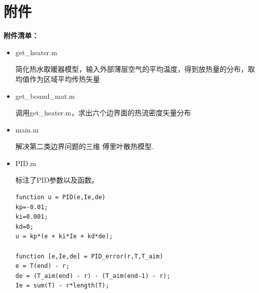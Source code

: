 \documentclass{my_paper}
\begin{document}
\newpage
\begin{center}
\end{center}

\newpage
\section{附件}
\textbf{附件清单：}
\renewcommand\theenumi{\roman{enumi}}
\renewcommand\labelenumi{\textbf{附录\theenumi}}
\begin{itemize}
    \item get\_heater.m 
    
    简化热水取暖器模型，输入外部薄层空气的平均温度，得到放热量的分布，取均值作为区域平均传热矢量
    
    \item get\_bound\_mat.m
    
    调用get\_heater.m，求出六个边界面的热流密度矢量分布
    
    \item main.m
    
    解决第二类边界问题的三维 傅里叶散热模型.
    

    \item PID.m
    
    标注了PID参数以及函数。
    \begin{lstlisting}[style=Matlab-editor]
function u = PID(e,Ie,de)
kp=-0.01;    
ki=0.001;
kd=0;
u = kp*(e + ki*Ie + kd*de);

function [e,Ie,de] = PID_error(r,T,T_aim)
e = T(end) - r;
de = (T_aim(end) - r) - (T_aim(end-1) - r);
Ie = sum(T) - r*length(T);
    \end{lstlisting}
\end{itemize}
\end{document}
